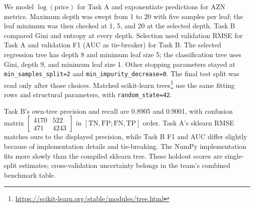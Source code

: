 We model $\log(\text{price})$ for Task A and exponentiate predictions for AZN metrics. Maximum depth was swept from 1 to 20 with five samples per leaf; the leaf minimum was then checked at 1, 5, and 20 at the selected depth. Task B compared Gini and entropy at every depth. Selection used validation RMSE for Task A and validation F1 (AUC as tie-breaker) for Task B. The selected regression tree has depth 8 and minimum leaf size 5; the classification tree uses Gini, depth 9, and minimum leaf size 1. Other stopping parameters stayed at \texttt{min\_samples\_split=2} and \texttt{min\_impurity\_decrease=0}. The final test split was read only after those choices. Matched scikit-learn trees\footnote{\url{https://scikit-learn.org/stable/modules/tree.html}} use the same fitting rows and structural parameters, with \texttt{random\_state=42}.

\begin{table}[t]
\centering
\caption{Tree test metrics on 9{,}406 held-out listings. Times are single-run seconds on the same machine.}
\label{tab:tree_results}
\end{table}

Task B's own-tree precision and recall are 0.8905 and 0.9001, with confusion matrix $\left[\begin{smallmatrix}4170&522\\471&4243\end{smallmatrix}\right]$ in $[\mathrm{TN},\mathrm{FP};\mathrm{FN},\mathrm{TP}]$ order. Task A's sklearn RMSE matches ours to the displayed precision, while Task B F1 and AUC differ slightly because of implementation details and tie-breaking. The NumPy implementation fits more slowly than the compiled sklearn tree. These holdout scores are single-split estimates; cross-validation uncertainty belongs in the team's combined benchmark table.

